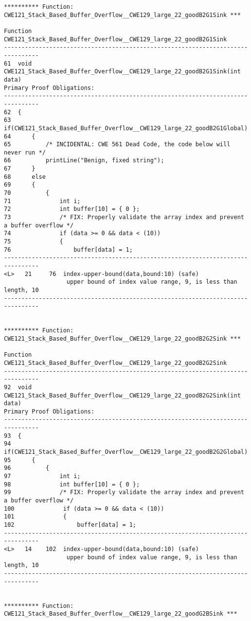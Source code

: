 \documentclass[11pt]{article}
\begin{document}
\begin{small}
\begin{verbatim}
********** Function: CWE121_Stack_Based_Buffer_Overflow__CWE129_large_22_goodB2G1Sink ***

Function CWE121_Stack_Based_Buffer_Overflow__CWE129_large_22_goodB2G1Sink
--------------------------------------------------------------------------------
61  void CWE121_Stack_Based_Buffer_Overflow__CWE129_large_22_goodB2G1Sink(int data)
Primary Proof Obligations:
--------------------------------------------------------------------------------
62  {
63      if(CWE121_Stack_Based_Buffer_Overflow__CWE129_large_22_goodB2G1Global)
64      {
65          /* INCIDENTAL: CWE 561 Dead Code, the code below will never run */
66          printLine("Benign, fixed string");
67      }
68      else
69      {
70          {
71              int i;
72              int buffer[10] = { 0 };
73              /* FIX: Properly validate the array index and prevent a buffer overflow */
74              if (data >= 0 && data < (10))
75              {
76                  buffer[data] = 1;
--------------------------------------------------------------------------------
<L>   21     76  index-upper-bound(data,bound:10) (safe)
                  upper bound of index value range, 9, is less than length, 10
--------------------------------------------------------------------------------


********** Function: CWE121_Stack_Based_Buffer_Overflow__CWE129_large_22_goodB2G2Sink ***

Function CWE121_Stack_Based_Buffer_Overflow__CWE129_large_22_goodB2G2Sink
--------------------------------------------------------------------------------
92  void CWE121_Stack_Based_Buffer_Overflow__CWE129_large_22_goodB2G2Sink(int data)
Primary Proof Obligations:
--------------------------------------------------------------------------------
93  {
94      if(CWE121_Stack_Based_Buffer_Overflow__CWE129_large_22_goodB2G2Global)
95      {
96          {
97              int i;
98              int buffer[10] = { 0 };
99              /* FIX: Properly validate the array index and prevent a buffer overflow */
100              if (data >= 0 && data < (10))
101              {
102                  buffer[data] = 1;
--------------------------------------------------------------------------------
<L>   14    102  index-upper-bound(data,bound:10) (safe)
                  upper bound of index value range, 9, is less than length, 10
--------------------------------------------------------------------------------


********** Function: CWE121_Stack_Based_Buffer_Overflow__CWE129_large_22_goodG2BSink ***


\end{verbatim}
\end{small}
\end{document}
